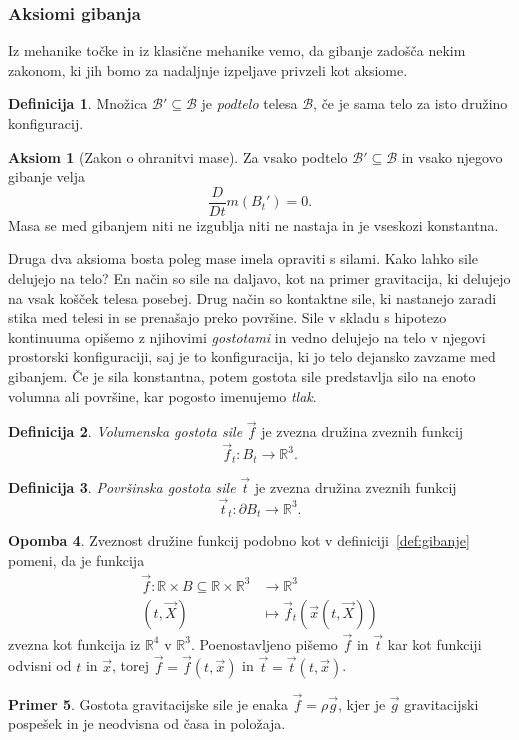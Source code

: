 \documentclass[12pt,a4paper,twoside]{article}
\theoremstyle{definition} %
\newtheorem{definicija}{Definicija}[section]
\newtheorem{primer}[definicija]{Primer}
\newtheorem{opomba}[definicija]{Opomba}
\newtheorem{aksiom}{Aksiom}
\theoremstyle{plain} %
\numberwithin{equation}{section}
\newcommand{\R}{\mathbb R}
\newcommand{\B}{\mathcal{B}}
\newcommand{\DD}[2]{\ensuremath{\frac{D #1}{D #2}}}
\newcommand{\DDt}[1]{\DD{#1}{t}}
\newcommand{\vt}{\vec{t}}
\newcommand{\vf}{\vec{f}}
\newcommand{\vX}{\vec{X}}
\newcommand{\vx}{\vec{x}}
\begin{document}
\subsubsection{Aksiomi gibanja}
Iz mehanike točke in iz klasične mehanike vemo, da gibanje zadošča nekim
zakonom, ki jih bomo za nadaljnje izpeljave privzeli kot aksiome.

\begin{definicija}
  Množica $\B' \subseteq \B$ je \emph{podtelo} telesa $\B$, če je sama telo za isto družino
  konfiguracij.
\end{definicija}

\begin{aksiom}[Zakon o ohranitvi mase]
  \label{aks:masa}
  Za vsako podtelo $\B' \subseteq  \B$ in vsako njegovo gibanje velja
  \begin{equation}
  \DDt{}m(B_t') = 0.
    \label{eq:masa}
  \end{equation}
  Masa se med gibanjem niti ne izgublja niti ne nastaja in je vseskozi konstantna.
\end{aksiom}

Druga dva aksioma bosta poleg mase imela opraviti s silami. Kako lahko sile delujejo na telo?  En
način so sile na daljavo, kot na primer gravitacija, ki delujejo na vsak košček telesa posebej.
Drug način so kontaktne sile, ki nastanejo zaradi stika med telesi in se prenašajo preko površine.
Sile v skladu s hipotezo kontinuuma opišemo z njihovimi \emph{gostotami} in vedno delujejo na
telo v njegovi prostorski konfiguraciji, saj je to konfiguracija, ki jo telo dejansko zavzame med
gibanjem. Če je sila konstantna, potem gostota sile predstavlja silo na enoto volumna ali
površine, kar pogosto imenujemo \emph{tlak}.

\begin{definicija}
  \emph{Volumenska gostota sile} $\vf$ je zvezna družina zveznih funkcij
  \begin{equation}
    \vf_t\colon B_t\to\R^3.
  \end{equation}
\end{definicija}
\begin{definicija}
  \emph{Površinska gostota sile} $\vt$ je zvezna družina zveznih funkcij
  \begin{equation}
   \vt_t\colon\partial B_t\to\R^3.
  \end{equation}
\end{definicija}
\begin{opomba}
  Zveznost družine funkcij podobno kot v definiciji~\ref{def:gibanje} pomeni, da je
  funkcija
  \begin{align*}
    \vf\colon \R \times B \subseteq \R \times \R^3 &\to \R^3 \\
    (t, \vX) &\mapsto \vf_t(\vx(t, \vX))
  \end{align*}
  zvezna kot funkcija iz $\R^4$ v $\R^3$. Poenostavljeno pišemo $\vf$ in $\vt$ kar kot funkciji
  odvisni od $t$ in $\vx$, torej $\vf = \vf(t, \vx)$ in $\vt = \vt(t, \vx)$.
\end{opomba}
\begin{primer}
  Gostota gravitacijske sile je enaka $\vf = \rho \vec{g}$, kjer je $\vec{g}$ gravitacijski
  pospešek in je neodvisna od časa in položaja.
\end{primer}
\end{document}
